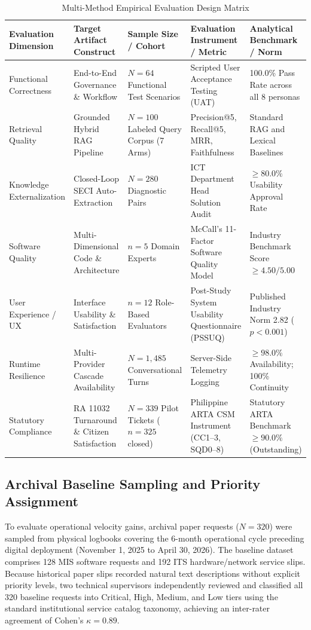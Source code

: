 \documentclass[conference]{IEEEtran}
\begin{document}
\begin{table}[t]
\caption{Multi-Method Empirical Evaluation Design Matrix}
\label{tab3}
\centering
\begin{tabularx}{\textwidth}{lXXXX}
\toprule
\textbf{Evaluation Dimension} & \textbf{Target Artifact Construct} & \textbf{Sample Size / Cohort} & \textbf{Evaluation Instrument / Metric} & \textbf{Analytical Benchmark / Norm} \\
\midrule
Functional Correctness & End-to-End Governance \& Workflow & $N = 64$ Functional Test Scenarios & Scripted User Acceptance Testing (UAT) & 100.0\% Pass Rate across all 8 personas \\
Retrieval Quality & Grounded Hybrid RAG Pipeline & $N = 100$ Labeled Query Corpus (7 Arms) & Precision@5, Recall@5, MRR, Faithfulness & Standard RAG and Lexical Baselines \\
Knowledge Externalization & Closed-Loop SECI Auto-Extraction & $N = 280$ Diagnostic Pairs & ICT Department Head Solution Audit & $\ge 80.0\%$ Usability Approval Rate \\
Software Quality & Multi-Dimensional Code \& Architecture & $n = 5$ Domain Experts & McCall's 11-Factor Software Quality Model & Industry Benchmark Score $\ge 4.50 / 5.00$ \\
User Experience / UX & Interface Usability \& Satisfaction & $n = 12$ Role-Based Evaluators & Post-Study System Usability Questionnaire (PSSUQ) & Published Industry Norm 2.82 ($p < 0.001$) \\
Runtime Resilience & Multi-Provider Cascade Availability & $N = 1,485$ Conversational Turns & Server-Side Telemetry Logging & $\ge 98.0\%$ Availability; 100\% Continuity \\
Statutory Compliance & RA 11032 Turnaround \& Citizen Satisfaction & $N = 339$ Pilot Tickets ($n=325$ closed) & Philippine ARTA CSM Instrument (CC1--3, SQD0--8) & Statutory ARTA Benchmark $\ge 90.0\%$ (Outstanding) \\
\bottomrule
\end{tabularx}
\end{table}

\subsection{Archival Baseline Sampling and Priority Assignment}
To evaluate operational velocity gains, archival paper requests ($N = 320$) were sampled from physical logbooks covering the 6-month operational cycle preceding digital deployment (November 1, 2025 to April 30, 2026). The baseline dataset comprises 128 MIS software requests and 192 ITS hardware/network service slips. Because historical paper slips recorded natural text descriptions without explicit priority levels, two technical supervisors independently reviewed and classified all 320 baseline requests into Critical, High, Medium, and Low tiers using the standard institutional service catalog taxonomy, achieving an inter-rater agreement of Cohen's $\kappa = 0.89$.
\end{document}
